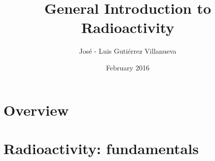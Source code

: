 \documentclass[xcolor=svgnames]{beamer}
\title
  [Feb 2016 \hspace{3cm} Krakow]
  {General Introduction to Radioactivity}
\author
  [J.L. Guti\'errez--Villanueva]
  {Jos\'e - Luis Guti\'errez Villanueva}
\date
  {February 2016}
\institute
  {LaRUC,  University of Cantabria (Spain)}
\newcommand{\1}{\'{\i}}
\begin{document}
\maketitle

%
%

\section*{Overview}
\begin{frame}{}
\tableofcontents[hideallsubsections]
\end{frame}

%

\section{Radioactivity: fundamentals}

\begin{frame}

\end{frame}
\end{document}
